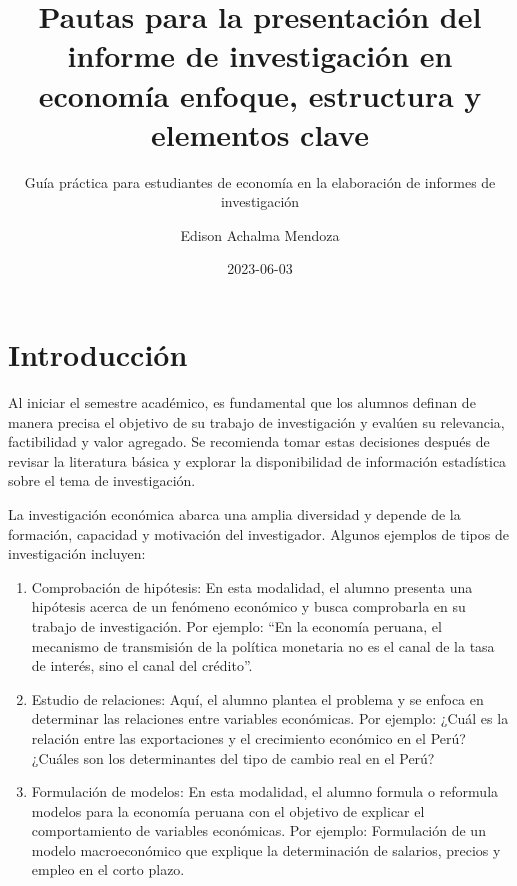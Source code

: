 \documentclass[
  letterpaper,
  DIV=11,
  numbers=noendperiod]{scrartcl}
\title{Pautas para la presentación del informe de investigación en
economía enfoque, estructura y elementos clave}
\subtitle{Guía práctica para estudiantes de economía en la elaboración
de informes de investigación}
\author{Edison Achalma Mendoza}
\date{2023-06-03}
\begin{document}
\maketitle
\ifdefined\Shaded\renewenvironment{Shaded}{\begin{tcolorbox}[interior hidden, borderline west={3pt}{0pt}{shadecolor}, frame hidden, sharp corners, boxrule=0pt, breakable, enhanced]}{\end{tcolorbox}}\fi

\hypertarget{introducciuxf3n}{%
\section{Introducción}\label{introducciuxf3n}}

Al iniciar el semestre académico, es fundamental que los alumnos definan
de manera precisa el objetivo de su trabajo de investigación y evalúen
su relevancia, factibilidad y valor agregado. Se recomienda tomar estas
decisiones después de revisar la literatura básica y explorar la
disponibilidad de información estadística sobre el tema de
investigación.

La investigación económica abarca una amplia diversidad y depende de la
formación, capacidad y motivación del investigador. Algunos ejemplos de
tipos de investigación incluyen:

\begin{enumerate}
\def\labelenumi{\arabic{enumi}.}
\item
  Comprobación de hipótesis: En esta modalidad, el alumno presenta una
  hipótesis acerca de un fenómeno económico y busca comprobarla en su
  trabajo de investigación. Por ejemplo: ``En la economía peruana, el
  mecanismo de transmisión de la política monetaria no es el canal de la
  tasa de interés, sino el canal del crédito''.
\item
  Estudio de relaciones: Aquí, el alumno plantea el problema y se enfoca
  en determinar las relaciones entre variables económicas. Por ejemplo:
  ¿Cuál es la relación entre las exportaciones y el crecimiento
  económico en el Perú? ¿Cuáles son los determinantes del tipo de cambio
  real en el Perú?
\item
  Formulación de modelos: En esta modalidad, el alumno formula o
  reformula modelos para la economía peruana con el objetivo de explicar
  el comportamiento de variables económicas. Por ejemplo: Formulación de
  un modelo macroeconómico que explique la determinación de salarios,
  precios y empleo en el corto plazo.
\end{enumerate}
\end{document}
